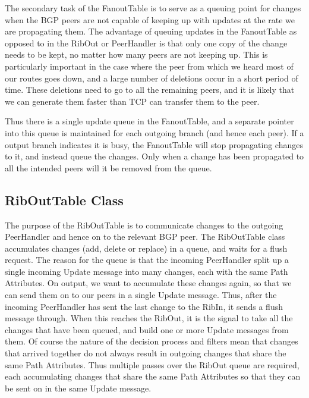 \documentclass[11pt]{article}
\begin{document}
The secondary task of the FanoutTable is to serve as a queuing point
for changes when the BGP peers are not capable of keeping up with
updates at the rate we are propagating them.  The advantage of queuing
updates in the FanoutTable as opposed to in the RibOut or PeerHandler
is that only one copy of the change needs to be kept, no matter how
many peers are not keeping up.  This is particularly important in the
case where the peer from which we heard most of our routes goes down,
and a large number of deletions occur in a short period of time.
These deletions need to go to all the remaining peers, and it is
likely that we can generate them faster than TCP can transfer them to
the peer.

Thus there is a single update queue in the FanoutTable, and a separate
pointer into this queue is maintained for each outgoing branch (and
hence each peer).  If a output branch indicates it is busy, the
FanoutTable will stop propagating changes to it, and instead queue the
changes.  Only when a change has been propagated to all the intended
peers will it be removed from the queue.  

\subsection{RibOutTable Class}

The purpose of the RibOutTable is to communicate changes to the
outgoing PeerHandler and hence on to the relevant BGP peer.  The
RibOutTable class accumulates changes (add, delete or replace) in a
queue, and waits for a flush request.  The reason for the queue is
that the incoming PeerHandler split up a single incoming Update message
into many changes, each with the same Path Attributes.  On output, we
want to accumulate these changes again, so that we can send them on to
our peers in a single Update message.  Thus, after the incoming
PeerHandler has sent the last change to the RibIn, it sends a flush
message through.  When this reaches the RibOut, it is the signal to
take all the changes that have been queued, and build one or more
Update messages from them.  Of course the nature of the decision
process and filters mean that changes that arrived together do not
always result in outgoing changes that share the same Path
Attributes.  Thus multiple passes over the RibOut queue are required,
each accumulating changes that share the same Path Attributes so that
they can be sent on in the same Update message.
\end{document}

